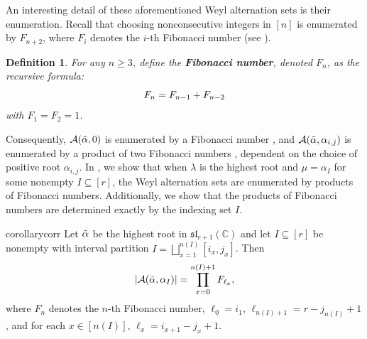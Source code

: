 \documentclass[10pt]{article}
\newtheorem{definition}[theorem]{Definition}
\newcommand{\speclin}[0]{\mathfrak{sl}_{r+1}(\mathbb{C})}
\newcommand{\hr}[0]{\Tilde{\alpha}}
\begin{document}
An interesting detail of these aforementioned Weyl alternation sets is their enumeration. Recall that choosing nonconsecutive integers in $[n]$ is enumerated by $F_{n+2}$, where $F_i$ denotes the $i$-th Fibonacci number (see ).
\begin{definition}
    For any $n\geq 3$, define the \textbf{Fibonacci number}, denoted $F_n$, as the recursive formula:
    \begin{equation}
        F_n = F_{n-1}+F_{n-2}\notag
    \end{equation}
    with $F_1=F_2=1$.
\end{definition}
Consequently, $\mathcal{A}(\hr,0)$ is enumerated by a Fibonacci number \cite{HarrisThesis}, and $\mathcal{A}(\hr,\alpha_{i,j})$ is enumerated by a product of two Fibonacci numbers \cite{harry2024computingqmultiplicitypositiveroots}, dependent on the choice of positive root $\alpha_{i,j}$.
In , we show that when $\lambda$ is the highest root and $\mu=\alpha_I$ for some nonempty $I\subseteq [r]$, the Weyl alternation sets are enumerated by products of Fibonacci numbers.
Additionally, we show that the products of Fibonacci numbers are determined exactly by the indexing set $I$.
\begin{restatable*}[]{corollary}{corr}\label{size of the alt set}
    Let $\hr$ be the highest root in $\speclin$ and let $I\subseteq [r]$ be nonempty with interval partition $I=\bigsqcup_{x=1}^{n(I)}[i_x,j_x]$. Then
    \begin{align}
        |\mathcal{A}(\hr,\alpha_I)|=\prod_{x=0}^{n(I)+1}F_{\ell_x},\notag
    \end{align}
    where $F_n$ denotes the $n$-th Fibonacci number, $\ell_0=i_1$, $\ell_{n(I)+1}=r-j_{n(I)}+1$, and for each $x\in[n(I)]$, $\ell_x=i_{x+1}-j_x+1$.
\end{restatable*}
\end{document}
